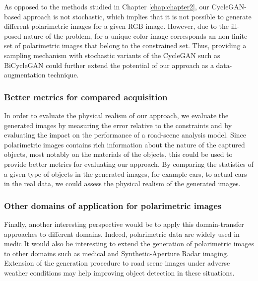 As opposed to the methods studied in Chapter \ref{chap:chapter2}, our CycleGAN-based approach is not stochastic, which implies that it is not possible to generate different polarimetric images for a given RGB image. However, due to the ill-posed nature of the problem, for a unique color image corresponds an non-finite set of polarimetric images that belong to the constrained set. Thus, providing a sampling mechanism with stochastic variants of the CycleGAN such as BiCycleGAN \citep{Zhu2017b} could further extend the potential of our approach as a data-augmentation technique.

\subsubsection*{Better metrics for compared acquisition}

In order to evaluate the physical realism of our approach, we evaluate the generated images by measuring the error relative to the constraints and by evaluating the impact on the performance of a road-scene analysis model. Since polarimetric images contains rich information about the nature of the captured objects, most notably on the materials of the objects, this could be used to provide better metrics for evaluating our approach. By comparing the statistics of a given type of objects in the generated images, for example cars, to actual cars in the real data, we could assess the physical realism of the generated images.

\subsubsection*{Other domains of application for polarimetric images}

Finally, another interesting perspective would be to apply this domain-transfer approaches to different domains. Indeed, polarimetric data are widely used in medic
It would also be interesting to extend the generation of polarimetric images to other domains such as medical and Synthetic-Aperture Radar \citep{vanZyl2011} imaging. Extension of the generation procedure to road scene images under adverse weather conditions may help improving object detection in these situations.
